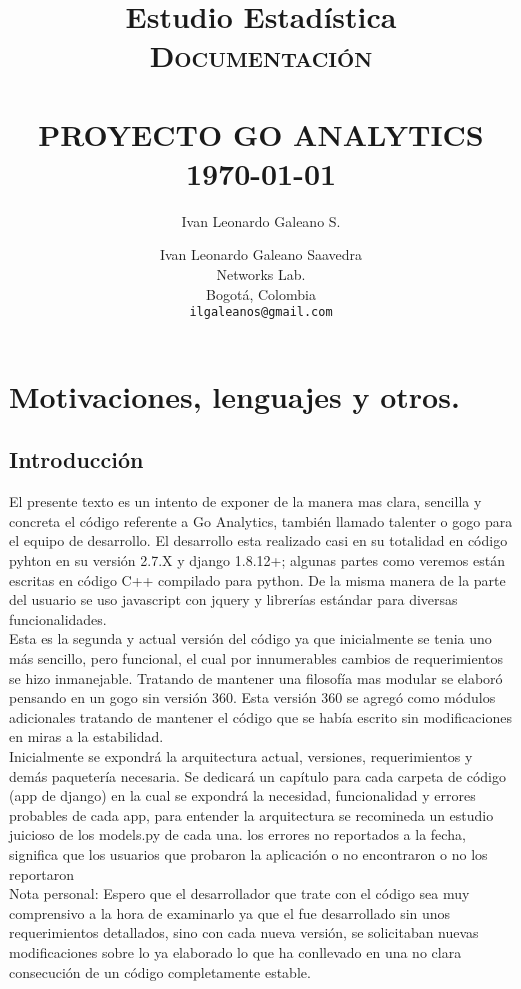 \documentclass[10pt,a4paper]{book}
\author{Ivan Leonardo Galeano S.}
\title{Estudio Estadística}
\title{	\normalsize \textsc{Documentación}
	\\[2.0cm]
	\HRule{0.5pt} \\
	\LARGE \textbf{\uppercase{Proyecto Go Analytics}}
	\HRule{2pt} \\ [0.5cm]
	\normalsize \today
}
\author{
	Ivan Leonardo Galeano Saavedra\\
	Networks Lab.\\
	Bogotá, Colombia\\
	\texttt{ilgaleanos@gmail.com} \\
}
\makeatletter
\def\printtitle{
	{\centering \@title\par}}
\def\printauthor{
	{\centering \large \@author}}
\makeatother
\begin{document}
	\thispagestyle{empty}
	\printtitle
	\vfill
	\printauthor

	\tableofcontents

	\chapter{Motivaciones, lenguajes y otros.}

	\section*{Introducción}

	El presente texto es un intento de exponer de la manera mas clara, sencilla y concreta el código referente a Go Analytics, también llamado talenter o gogo para el equipo de desarrollo. El desarrollo esta realizado casi en su totalidad en código pyhton en su versión 2.7.X y django 1.8.12+; algunas partes como veremos están escritas en código C++ compilado para python. De la misma manera de la parte del usuario se uso javascript con jquery y librerías estándar para diversas funcionalidades.\\

	Esta es la segunda y actual versión del código ya que inicialmente se tenia uno más sencillo, pero funcional, el cual por innumerables cambios de requerimientos se hizo inmanejable. Tratando de mantener una filosofía mas modular se elaboró pensando en un gogo sin versión 360. Esta versión 360 se agregó como módulos adicionales tratando de mantener el código que se había escrito sin modificaciones en miras a la estabilidad.\\

	Inicialmente se expondrá la arquitectura actual, versiones, requerimientos y demás paquetería necesaria. Se dedicará un capítulo para cada carpeta de código (app de django) en la cual se expondrá la necesidad, funcionalidad y errores probables de cada app, para entender la arquitectura se recomineda un estudio juicioso de los models.py de cada una. los errores no reportados a la fecha, significa que los usuarios que probaron la aplicación o no encontraron o no los reportaron\\

	Nota personal: Espero que el desarrollador que trate con el código sea muy comprensivo a la hora de examinarlo ya que el fue desarrollado sin unos requerimientos detallados, sino con cada nueva versión, se solicitaban nuevas modificaciones sobre lo ya elaborado lo que ha conllevado en una no clara consecución de un código completamente estable.\\
\end{document}

